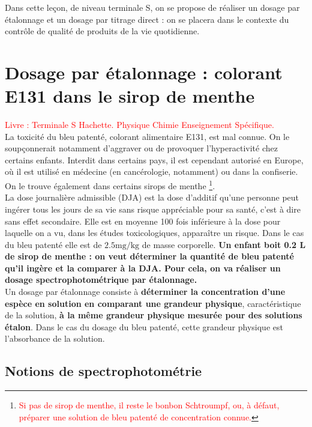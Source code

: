 \documentclass[11pt,a4paper]{report}
\begin{document}
Dans cette leçon, de niveau terminale S, on se propose de réaliser un dosage par étalonnage et un dosage par titrage direct : on se placera dans le contexte du contrôle de qualité de produits de la vie quotidienne.

\section{Dosage par étalonnage : colorant E131 dans le sirop de menthe}
\textcolor{red}{Livre : Terminale S Hachette. Physique Chimie Enseignement Spécifique.}\\

La toxicité du bleu patenté, colorant alimentaire E131, est mal connue. On le soupçonnerait notamment d'aggraver ou de provoquer l'hyperactivité chez certains enfants. Interdit dans certains pays, il est cependant autorisé en Europe, où il est utilisé en médecine (en cancérologie, notamment) ou dans la confiserie. On le trouve également dans certains sirops de menthe \footnote{\textcolor{red}{Si pas de sirop de menthe, il reste le bonbon Schtroumpf, ou, à défaut, préparer une solution de bleu patenté de concentration connue.}}.\\  

La dose journalière admissible (DJA) est la dose d'additif qu'une personne peut ingérer tous les jours de sa vie sans risque appréciable pour sa santé, c'est à dire sans effet secondaire. Elle est en moyenne 100 fois inférieure à la dose pour laquelle on a vu, dans les études toxicologiques, apparaître un risque. Dans le cas du bleu patenté elle est de $2.5 \text{mg}/\text{kg}$ de masse corporelle. \textbf{Un enfant boit 0.2 L de sirop de menthe : on veut déterminer la quantité de bleu patenté qu'il ingère et la comparer à la DJA. Pour cela, on va réaliser un dosage spectrophotométrique par étalonnage.}\\

Un dosage par étalonnage consiste à \textbf{déterminer la concentration d'une espèce en solution en comparant une grandeur physique}, caractéristique de la solution, \textbf{à la même grandeur physique mesurée pour des solutions étalon}. Dans le cas du dosage du bleu patenté, cette grandeur physique est l'absorbance de la solution. 

\subsection{Notions de spectrophotométrie}
\end{document}

